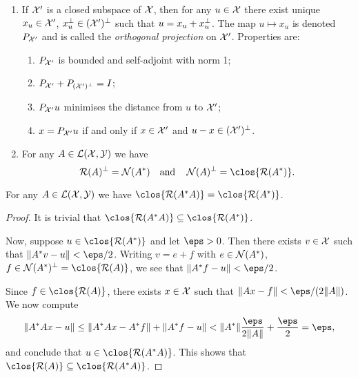 \begin{recap}
\begin{enumerate}
        \item If $\XXX'$ is a closed subspace of $\XXX$, then for any $u \in \XXX$ there exist unique $x_u \in \XXX'$, $x_u\P \in (\XXX')\P$ such that $u = x_u + x_u\P$. The map $u \mapsto x_u$ is denoted $P_{\XXX'}$ and is called the \emph{orthogonal projection} on $\XXX'$. Properties are:
        \begin{enumerate}
            \item $P_{\XXX'}$ is bounded and self-adjoint with norm 1;
            \item $P_{\XXX'} + P_{(\XXX')\P} = I$;
            \item $P_{\XXX'}u$ minimises the distance from $u$ to $\XXX'$;
            \item $x = P_{\XXX'}u$ if and only if $x \in \XXX'$ and $u - x \in (\XXX')\P$. 
        \end{enumerate}
    
    \item For any $A \in \LLL(\XXX, \YYY)$ we have
    \[
    \Ran(A)\P = \Nul(A^*) \quad\text{and}\quad \Nul(A)\P = \clos{\Ran(A^*)}. 
    \]

     \end{enumerate}
\end{recap}

\begin{lemma}
    For any $A \in \LLL(\XXX, \YYY)$ we have $\clos{\Ran(A^*A)} = \clos{\Ran(A^*)}$. 
\end{lemma}

\begin{proof}
    It is trivial that $\clos{\Ran(A^*A)} \subseteq \clos{\Ran(A^*)}$. 
    
    Now, suppose $u \in \clos{\Ran(A^*)}$ and let $\eps > 0$. Then there exists $v \in \XXX$ such that $\norm{A^*v - u} < \eps/2$. Writing $v = e + f$ with $e \in \Nul(A^*)$, $f \in \Nul(A^*)\P = \clos{\Ran(A)}$, we see that $\norm{A^*f - u} < \eps/2$. 
    
    Since $f \in \clos{\Ran(A)}$, there exists $x \in \XXX$ such that $\norm{Ax - f} < \eps/(2\norm{A})$. We now compute
    \[
    \norm{A^* A x - u} \leq \norm{A^*A x - A^* f} + \norm{A^*f - u} < \norm{A^*} \frac{\eps}{2\norm{A}} + \frac\eps2 = \eps, 
    \]
    and conclude that $u \in \clos{\Ran(A^*A)}$. This shows that $\clos{\Ran(A)} \subseteq \clos{\Ran(A^*A)}$. 
\end{proof}

